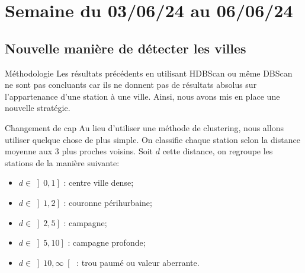 \smallframetitle

\section{Semaine du 03/06/24 au 06/06/24}
\insertsectionframe

\subsection{Nouvelle manière de détecter les villes}
\insertsubsectionframe

\begin{frame}{Méthodologie}
    Les résultats précédents en utilisant HDBScan ou même DBScan ne sont pas concluants car ils ne donnent pas de résultats absolus sur l'appartenance d'une station à une ville. Ainsi, nous avons mis en place une nouvelle stratégie.
    \begin{block}{Changement de cap}
        Au lieu d'utiliser une méthode de clustering, nous allons utiliser quelque chose de plus simple.
        On classifie chaque station selon la distance moyenne aux $3$ plus proches voisins. %
        Soit $d$ cette distance, on regroupe les stations de la manière suivante:
        \begin{itemize}
            \item $d\in\left]0, 1\right]$ : centre ville dense;
            \item $d\in\left]1, 2\right]$ : couronne périhurbaine;
            \item $d\in\left]2, 5\right]$ : campagne;
            \item $d\in\left]5, 10\right]$ : campagne profonde;
            \item $d\in\left]10, \infty\right[$ : trou paumé ou valeur aberrante.
        \end{itemize}
    \end{block}
\end{frame}

